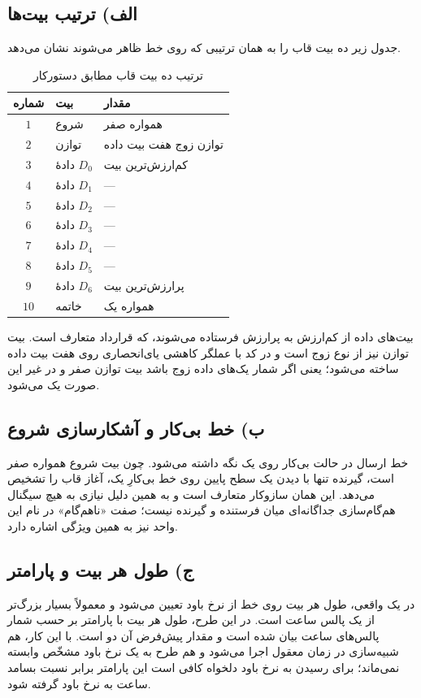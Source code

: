 \documentclass[12pt,a4paper]{article}
\begin{document}
	\subsection*{الف) ترتیب بیت‌ها}
	جدول زیر ده بیت قاب را به همان ترتیبی که روی خط ظاهر می‌شوند نشان می‌دهد.

	\begin{table}[H]
		\centering
		\small
		\begin{tabular}{|c|l|l|}
			\hline
			\textbf{شماره} & \textbf{بیت} & \textbf{مقدار} \\ \hline
			\(1\)  & شروع        & همواره صفر \\ \hline
			\(2\)  & توازن       & توازن زوج هفت بیت داده \\ \hline
			\(3\)  & دادهٔ \(D_0\) & کم‌ارزش‌ترین بیت \\ \hline
			\(4\)  & دادهٔ \(D_1\) & --- \\ \hline
			\(5\)  & دادهٔ \(D_2\) & --- \\ \hline
			\(6\)  & دادهٔ \(D_3\) & --- \\ \hline
			\(7\)  & دادهٔ \(D_4\) & --- \\ \hline
			\(8\)  & دادهٔ \(D_5\) & --- \\ \hline
			\(9\)  & دادهٔ \(D_6\) & پرارزش‌ترین بیت \\ \hline
			\(10\) & خاتمه       & همواره یک \\ \hline
		\end{tabular}
		\caption{ترتیب ده بیت قاب مطابق دستورکار}
	\end{table}

	بیت‌های داده از کم‌ارزش به پرارزش فرستاده می‌شوند، که قرارداد متعارف  است. بیت توازن نیز از نوع زوج است و در کد با عملگر کاهشی یای‌انحصاری روی هفت بیت داده ساخته می‌شود؛ یعنی اگر شمار یک‌های داده زوج باشد بیت توازن صفر و در غیر این صورت یک می‌شود.

	\subsection*{ب) خط بی‌کار و آشکارسازی شروع}
	خط ارسال در حالت بی‌کار روی یک نگه داشته می‌شود. چون بیت شروع همواره صفر است، گیرنده تنها با دیدن یک سطح پایین روی خط بی‌کارِ یک، آغاز قاب را تشخیص می‌دهد. این همان سازوکار متعارف  است و به همین دلیل نیازی به هیچ سیگنال هم‌گام‌سازی جداگانه‌ای میان فرستنده و گیرنده نیست؛ صفت «ناهم‌گام» در نام این واحد نیز به همین ویژگی اشاره دارد.

	\subsection*{ج) طول هر بیت و پارامتر }
	در یک  واقعی، طول هر بیت روی خط از نرخ باود تعیین می‌شود و معمولاً بسیار بزرگ‌تر از یک پالس ساعت است. در این طرح، طول هر بیت با پارامتر  بر حسب شمار پالس‌های ساعت بیان شده است و مقدار پیش‌فرض آن دو است. با این کار، هم شبیه‌سازی در زمان معقول اجرا می‌شود و هم طرح به یک نرخ باود مشخّص وابسته نمی‌ماند؛ برای رسیدن به نرخ باود دلخواه کافی است این پارامتر برابر نسبت بسامد ساعت به نرخ باود گرفته شود.
\end{document}
